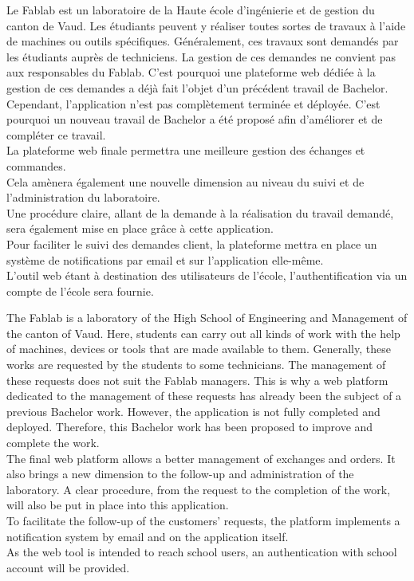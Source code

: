 Le Fablab est un laboratoire de la Haute école d'ingénierie et de gestion du canton de Vaud.
Les étudiants peuvent y réaliser toutes sortes de travaux à l'aide de machines ou outils spécifiques. Généralement, ces travaux sont demandés par les étudiants auprès de techniciens.
La gestion de ces demandes ne convient pas aux responsables du Fablab. C'est pourquoi une plateforme web dédiée à la gestion de ces demandes a déjà fait l'objet d'un précédent travail de Bachelor.
Cependant, l'application n'est pas complètement terminée et déployée. C'est pourquoi un nouveau travail de Bachelor a été proposé afin d'améliorer et de compléter ce travail.\\
La plateforme web finale permettra une meilleure gestion des échanges et commandes.\\
Cela amènera également une nouvelle dimension au niveau du suivi et de l'administration du laboratoire.\\
Une procédure claire, allant de la demande à la réalisation du travail demandé, sera également mise en place grâce à cette application.\\
Pour faciliter le suivi des demandes client, la plateforme mettra en place un système de notifications par email et sur l'application elle-même.\\
L'outil web étant à destination des utilisateurs de l'école, l'authentification via un compte de l'école sera fournie.

\asterism

The Fablab is a laboratory of the High School of Engineering and Management of the canton of Vaud.
Here, students can carry out all kinds of work with the help of machines, devices or tools that are made available to them. Generally, these works are requested by the students to some technicians.
The management of these requests does not suit the Fablab managers.
This is why a web platform dedicated to the management of these requests has already been the subject of a previous Bachelor work. However, the application is not fully completed and deployed. Therefore, this Bachelor work has been proposed to improve and complete the work. \\
The final web platform allows a better management of exchanges and orders.
It also brings a new dimension to the follow-up and administration of the laboratory.
A clear procedure, from the request to the completion of the work, will also be put in place into this application. \\
To facilitate the follow-up of the customers' requests, the platform implements a notification system by email and on the application itself. \\
As the web tool is intended to reach school users, an authentication with school account will be provided.
